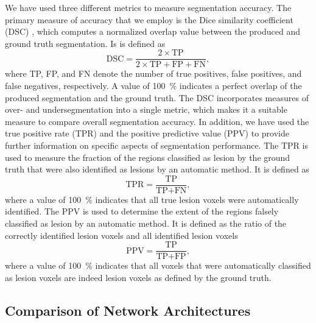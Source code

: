 We have used three different metrics to measure segmentation accuracy. The
primary measure of accuracy that we employ is the Dice similarity coefficient
(DSC) \cite{dice1945measures}, which computes a normalized overlap value between
the produced and ground truth segmentation. Is is defined as
\begin{equation}
\text{DSC} = \frac{2 \times \text{TP}}{2 \times \text{TP} + \text{FP} +
\text{FN}},
\end{equation}
where TP, FP, and FN denote the number of true positives, false positives, and
false negatives, respectively. A value of \SI{100}{\percent} indicates a perfect
overlap of the produced segmentation and the ground truth. The DSC incorporates
measures of over- and undersegmentation into a single metric, which makes it a
suitable measure to compare overall segmentation accuracy. In addition, we have
used the true positive rate (TPR) and the positive predictive value (PPV) to
provide further information on specific aspects of segmentation performance. The
TPR is used to measure the fraction of the regions classified as lesion by the
ground truth that were also identified as lesions by an automatic method. It is
defined as
\begin{equation}
\text{TPR} = \frac{\text{TP}}{\text{TP} + \text{FN}},
\end{equation}
where a value of \SI{100}{\percent} indicates that all true lesion voxels were
automatically identified. The PPV is used to determine the extent of the regions
falsely classified as lesion by an automatic method. It is defined as the ratio of
the correctly identified lesion voxels and all identified lesion voxels
\begin{equation}
\text{PPV} = \frac{\text{TP}}{\text{TP} + \text{FP}},
\end{equation}
where a value of \SI{100}{\percent} indicates that all voxels that were
automatically classified as lesion voxels are indeed lesion voxels as defined
by the ground truth.

\subsection{Comparison of Network Architectures}

